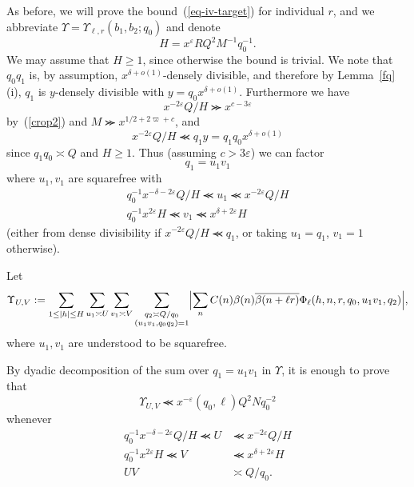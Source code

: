 \documentclass[12pt,a4paper,reqno]{amsart}
\numberwithin{equation}{section}
\theoremstyle{plain}
\theoremstyle{definition}
\newcommand\eps{\varepsilon}
\renewcommand{\sim}{\asymp}
\renewcommand{\lessapprox}{\llcurly}
\begin{document}
As before, we will prove the bound~(\ref{eq-iv-target}) for individual
$r$, and we abbreviate $\Upsilon=\Upsilon_{\ell,r}(b_1,b_2;q_0)$ and
denote
$$
H=x^{\eps}RQ^2M^{-1}q_0^{-1}.  
$$
We may assume that $H\geq 1$, since otherwise the bound is trivial.
We note that $q_0q_1$ is, by assumption,
$x^{\delta+o(1)}$-densely divisible, and therefore by
Lemma~\ref{fq}(i), $q_1$ is $y$-densely divisible with
$y=q_0x^{\delta+o(1)}$. Furthermore we have
$$
x^{-2\eps} Q/H\ggcurly x^{c-3\eps}
$$
by~(\ref{crop2}) and $M\ggcurly x^{1/2+2\varpi+c}$, and
$$
x^{-2\eps} Q/H\lessapprox q_1y=q_1q_0x^{\delta+o(1)}
$$
since $q_1q_0\sim Q$ and $H\geq 1$. Thus (assuming $c>3\eps$) we can factor
$$
q_1=u_1v_1
$$
where $u_1,v_1$ are squarefree with
\begin{gather*}
  q_0^{-1} x^{-\delta-2\eps} Q/H \lessapprox u_1 \lessapprox
  x^{-2\eps} Q/H\\
  q_0^{-1} x^{2\eps} H \lessapprox v_1 \lessapprox x^{\delta+2\eps} H
\end{gather*}
(either from dense divisibility if $x^{-2\eps}Q/H\lessapprox q_1$, or
taking $u_1=q_1$, $v_1=1$ otherwise).
\par
Let
$$
\Upsilon_{U,V}:=\sum_{1 \leq |h| \leq H} \sum_{u_1 \sim U} \sum_{v_1
  \sim V} \sum_{\substack{q_2 \sim Q/q_0\\ (u_1v_1,q_0q_2)= 1}}\Bigl|
\sum_n C(n)\beta(n) \overline{\beta(n+\ell r)}
\Phi_{\ell}(h,n,r,q_0,u_1v_1,q_2)\Bigr|,
$$
where $u_1,v_1$ are understood to be squarefree.
\par
By dyadic decomposition of the sum over $q_1=u_1v_1$ in $\Upsilon$, it
is enough to prove that
\begin{equation}\label{eq-upsilon-dyadic}
\Upsilon_{U,V}\lessapprox x^{-\eps}(q_0,\ell)Q^2Nq_0^{-2}
\end{equation}
whenever
\begin{align}
  q_0^{-1} x^{-\delta-2\eps} Q/H \lessapprox U &\lessapprox x^{-2\eps} Q/H \label{s-bound}\\
  q_0^{-1} x^{2\eps} H \lessapprox V &\lessapprox x^{\delta+2\eps} H \label{t-bound}\\
  UV &\sim Q/q_0. \label{st}
\end{align}
\end{document}

